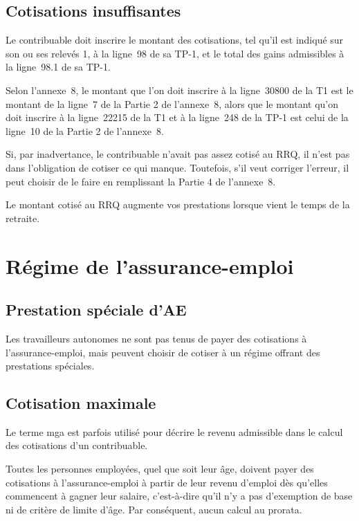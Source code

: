 \subsection{Cotisations insuffisantes}
Le contribuable doit inscrire le montant des cotisations, tel qu'il est indiqué sur son ou ses relevés 1, à la ligne~98 de sa TP-1, et le total des gains admissibles à la ligne~98.1 de sa TP-1. 

Selon l'annexe~8, le montant que l'on doit inscrire à la ligne~30800 de la T1 est le montant de la ligne~7 de la Partie 2 de l'annexe~8, alors que le montant qu'on doit inscrire à la ligne~22215 de la T1 et à la ligne~248 de la TP-1 est celui de la ligne~10 de la Partie 2 de l'annexe~8.

Si, par inadvertance, le contribuable n'avait pas assez cotisé au RRQ, il n'est pas dans l'obligation de cotiser ce qui manque. Toutefois, s'il veut corriger l'erreur, il peut choisir de le faire en remplissant la Partie 4 de l'annexe~8.

\begin{note}
	Le montant cotisé au RRQ augmente vos prestations lorsque vient le temps de la retraite.
\end{note}



\section{Régime de l'assurance-emploi}
\subsection{Prestation spéciale d'AE}
Les travailleurs autonomes ne sont pas tenus de payer des cotisations à l'assurance-emploi, mais peuvent choisir de cotiser à un régime offrant des prestations spéciales.


\subsection{Cotisation maximale}
\begin{note}
	Le terme \acrfull{mga} est parfois utilisé pour décrire le revenu admissible dans le calcul des cotisations d'un contribuable.
\end{note}
Toutes les personnes employées, quel que soit leur âge, doivent payer des cotisations à l'assurance-emploi à partir de leur revenu d'emploi dès qu'elles commencent à gagner leur salaire, c'est-à-dire qu'il n'y a pas d'exemption de base ni de critère de limite d'âge. Par conséquent, aucun calcul au prorata.


